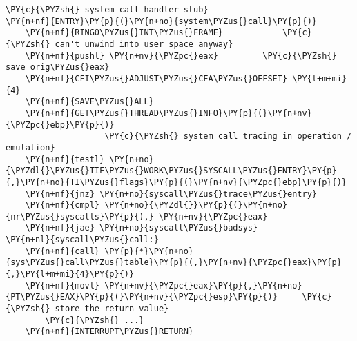 \begin{Verbatim}[commandchars=\\\{\}]
	\PY{c}{\PYZsh{} system call handler stub}
\PY{n+nf}{ENTRY}\PY{p}{(}\PY{n+no}{system\PYZus{}call}\PY{p}{)}
	\PY{n+nf}{RING0\PYZus{}INT\PYZus{}FRAME}			\PY{c}{\PYZsh{} can't unwind into user space anyway}
	\PY{n+nf}{pushl} \PY{n+nv}{\PYZpc{}eax}			\PY{c}{\PYZsh{} save orig\PYZus{}eax}
	\PY{n+nf}{CFI\PYZus{}ADJUST\PYZus{}CFA\PYZus{}OFFSET} \PY{l+m+mi}{4}
	\PY{n+nf}{SAVE\PYZus{}ALL}
	\PY{n+nf}{GET\PYZus{}THREAD\PYZus{}INFO}\PY{p}{(}\PY{n+nv}{\PYZpc{}ebp}\PY{p}{)}
					\PY{c}{\PYZsh{} system call tracing in operation / emulation}
	\PY{n+nf}{testl} \PY{n+no}{\PYZdl{}\PYZus{}TIF\PYZus{}WORK\PYZus{}SYSCALL\PYZus{}ENTRY}\PY{p}{,}\PY{n+no}{TI\PYZus{}flags}\PY{p}{(}\PY{n+nv}{\PYZpc{}ebp}\PY{p}{)}
	\PY{n+nf}{jnz} \PY{n+no}{syscall\PYZus{}trace\PYZus{}entry}
	\PY{n+nf}{cmpl} \PY{n+no}{\PYZdl{}}\PY{p}{(}\PY{n+no}{nr\PYZus{}syscalls}\PY{p}{),} \PY{n+nv}{\PYZpc{}eax}
	\PY{n+nf}{jae} \PY{n+no}{syscall\PYZus{}badsys}
\PY{n+nl}{syscall\PYZus{}call:}
	\PY{n+nf}{call} \PY{p}{*}\PY{n+no}{sys\PYZus{}call\PYZus{}table}\PY{p}{(,}\PY{n+nv}{\PYZpc{}eax}\PY{p}{,}\PY{l+m+mi}{4}\PY{p}{)}
	\PY{n+nf}{movl} \PY{n+nv}{\PYZpc{}eax}\PY{p}{,}\PY{n+no}{PT\PYZus{}EAX}\PY{p}{(}\PY{n+nv}{\PYZpc{}esp}\PY{p}{)}		\PY{c}{\PYZsh{} store the return value}
        \PY{c}{\PYZsh{} ...}
	\PY{n+nf}{INTERRUPT\PYZus{}RETURN}
\end{Verbatim}
